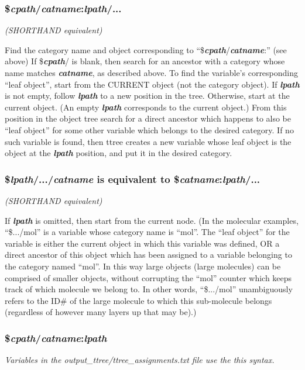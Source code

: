 \documentclass[11pt]{article}
\begin{document}
\subsubsection*{\$\textit{\textbf{cpath}}/\textit{\textbf{catname}}:\textit{\textbf{lpath}}/...}
\textit{(SHORTHAND equivalent)}

Find the category name and object corresponding to ``\$\textit{\textbf{cpath}}/\textit{\textbf{catname}}:''
(see above)
If \$\textit{\textbf{cpath}}/ is blank, then search for an ancestor with a category whose name matches \textit{\textbf{catname}}, as described above.
To find the variable's corresponding ``leaf object'', start from the CURRENT object (not the category object).  If \textit{\textbf{lpath}} is not empty, follow \textit{\textbf{lpath}} to a new position in the tree.  Otherwise, start at the current object.  (An empty \textit{\textbf{lpath}} corresponds to the current object.)  From this position in the object tree search for a direct ancestor which happens to also be ``leaf object'' for some other variable which belongs to the desired category.  If no such variable is found, then ttree creates a new variable whose leaf object is the object at the \textit{\textbf{lpath}} position, and put it in the desired category.

\subsubsection*{\$\textit{\textbf{lpath}}/.../\textit{\textbf{catname}} is equivalent to \$\textit{\textbf{catname}}:\textit{\textbf{lpath}}/...}
\textit{(SHORTHAND equivalent)}

If \textit{\textbf{lpath}} is omitted, then start from the current node.
(In the molecular examples, ``\$.../mol'' is a variable whose category name is ``mol''.  The ``leaf object'' for the variable is either the current object in which this variable was defined, OR a direct ancestor of this object which has been assigned to a variable belonging to the category named ``mol''.  In this way large objects (large molecules) can be comprised of smaller objects, without corrupting the ``mol'' counter which keeps track of which molecule we belong to.  In other words, ``\$.../mol'' unambiguously refers to the ID\# of the large molecule to which this sub-molecule belongs (regardless of however many layers up that may be).)

\subsubsection*{\$\textit{\textbf{cpath}}/\textit{\textbf{catname}}:\textit{\textbf{lpath}}}
\textit{Variables in the output\_ttree/ttree\_assignments.txt file 
        use the this syntax.}
\end{document}
